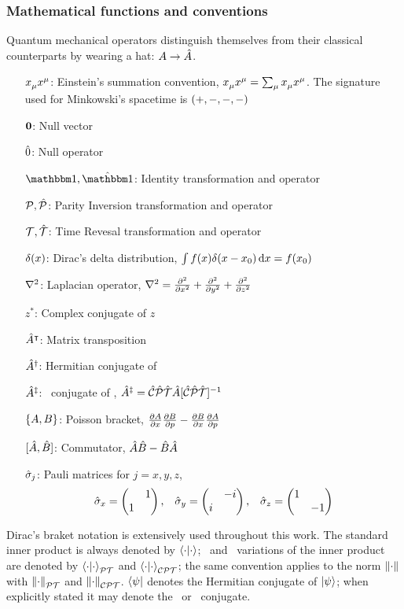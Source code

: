 \subsubsection{Mathematical functions and conventions}
Quantum mechanical operators distinguish themselves from their classical counterparts by wearing a hat: $A \to \hat{A}$.
\begin{enumerate}
    \item[$\tensor{x}{_\mu}\tensor{x}{^\mu}$:] Einstein's summation convention, $\tensor{x}{_\mu}\tensor{x}{^\mu} = \sum\nolimits_\mu \tensor{x}{_\mu}\tensor{x}{^\mu}$. The signature used for Minkowski's spacetime is $\pqty{+,-, -, -}$
    \item[$\vb{0}$:] Null vector
    \item[$\hat{0}$:] Null operator 
    \item[$\idM,\hidM$:] Identity transformation and operator
    \item[$\mathcal{P},\mathcal{\hat{P}}$:] Parity Inversion transformation and operator  
    \item[$\mathcal{T},\mathcal{\hat{T}}$:] Time Revesal transformation and operator
    \item[$\delta\pqty{x}$:] Dirac's delta distribution, $\int{f\pqty{x}\delta\pqty{x-x_0}\dd{x}} = f\pqty{x_0}$
    \item[$\laplacian$:] Laplacian operator, $\laplacian = \pdv[2]{x} + \pdv[2]{y} + \pdv[2]{z}$ 
    \item[$z^*$:] Complex conjugate of $z$
    \item[$\hat{A}^\intercal$:] Matrix transposition
    \item[$\hat{A}^\dag$:] Hermitian conjugate of \hA
    \item[$\hat{A}^\ddag$:] \CPT\ conjugate of \hA, $\hA^\ddag = \CPTtransform{\hA}$
    \item[$\acomm*{A}{B}\!$:] Poisson bracket, $\pdv{A}{x}\pdv{B}{p} - \pdv{B}{x}\pdv{A}{p}$
    \item[$\comm*{\hA}{\hB}\!$:] Commutator, $\hat{A}\hat{B} - \hat{B}\hat{A}$  
    \item[$\hat{\sigma}_j$:] Pauli matrices for $j=x,y,z$,
        \begin{equation*}
            \togglehat{\sigma}_x = \pmqty{\admat{1,1}}
            \mycomma \quad
            \togglehat{\sigma}_y = \pmqty{\admat{-i,i}}
            \mycomma \quad
            \togglehat{\sigma}_z = \pmqty{\dmat{1,-1}}
        \end{equation*} 
\end{enumerate}
Dirac's braket notation is extensively used throughout this work. The standard inner product is always denoted by $\bra{\cdot}\ket{\cdot}$; \PT\ and \CPT\ variations of the inner product are denoted by $\braket{\cdot}{\cdot}_{\mathcal{P}\mathcal{T}}$ and $\braket{\cdot}{\cdot}_{\mathcal{C}\mathcal{P}\mathcal{T}}$; the same convention applies to the norm $\norm{\cdot}$ with $\norm{\cdot}_{\mathcal{P}\mathcal{T}}$ and $\norm{\cdot}_{\mathcal{C}\mathcal{P}\mathcal{T}}$. $\bra{\psi}$ denotes the Hermitian conjugate of $\ket{\psi}$; when explicitly stated it may denote the \PT\ or \CPT\ conjugate.